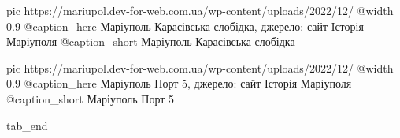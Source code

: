   pic https://mariupol.dev-for-web.com.ua/wp-content/uploads/2022/12/%
  @width 0.9
  @caption_here Маріуполь Карасівська слобідка, джерело: сайт Історія Маріуполя
  @caption_short Маріуполь Карасівська слобідка

  pic https://mariupol.dev-for-web.com.ua/wp-content/uploads/2022/12/%
  @width 0.9
  @caption_here Маріуполь Порт 5, джерело: сайт Історія Маріуполя
  @caption_short Маріуполь Порт 5




  tab_end
\fi
